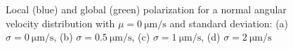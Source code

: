 \documentclass[../../master_thesis_np.tex]{subfiles}
\begin{document}
		\begin{figure}[htp]
			\centering\
			\\
			\\
			
			\caption{Local (blue) and global (green) polarization for a normal angular velocity distribution with $\mu = \SI{0}{\um\per\second}$ and standard deviation: (a) $\sigma = \SI{0}{\um\per\second}$, (b) $\sigma = \SI{0.5}{\um\per\second}$, (c) $\sigma = \SI{1}{\um\per\second}$, (d) $\sigma = \SI{2}{\um\per\second}$}
			\label{fig:lj_av_pol}
		\end{figure}
		
\end{document}
